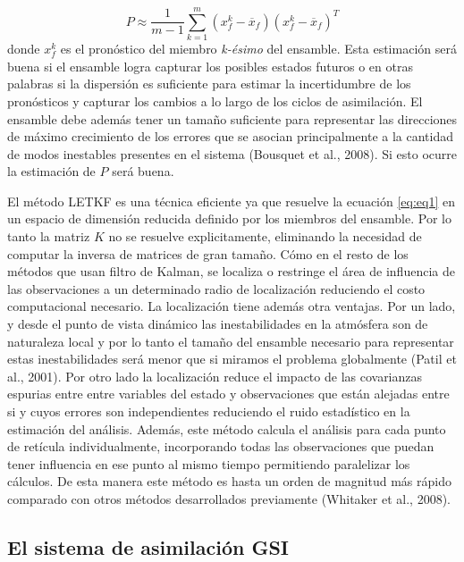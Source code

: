 \documentclass[12pt,oneside,a4paper]{reedthesis}
\begin{document}
\begin{equation}
P \approx \frac{1}{m-1} \sum_{k=1}^{m}(x_{f}^{k}-\overline{x}_f)(x_{f}^{k}-\overline{x}_f)^T
\label{eq:eq5}
\end{equation}
donde \(x_{f}^{k}\) es el pronóstico del miembro \emph{k-ésimo} del ensamble. Esta estimación será buena si el ensamble logra capturar los posibles estados futuros o en otras palabras si la dispersión es suficiente para estimar la incertidumbre de los pronósticos y capturar los cambios a lo largo de los ciclos de asimilación. El ensamble debe además tener un tamaño suficiente para representar las direcciones de máximo crecimiento de los errores que se asocian principalmente a la cantidad de modos inestables presentes en el sistema (Bousquet et al., 2008). Si esto ocurre la estimación de \(P\) será buena.

El método LETKF es una técnica eficiente ya que resuelve la ecuación \eqref{eq:eq1} en un espacio de dimensión reducida definido por los miembros del ensamble. Por lo tanto la matriz \(K\) no se resuelve explicitamente, eliminando la necesidad de computar la inversa de matrices de gran tamaño. Cómo en el resto de los métodos que usan filtro de Kalman, se localiza o restringe el área de influencia de las observaciones a un determinado radio de localización reduciendo el costo computacional necesario. La localización tiene además otra ventajas. Por un lado, y desde el punto de vista dinámico las inestabilidades en la atmósfera son de naturaleza local y por lo tanto el tamaño del ensamble necesario para representar estas inestabilidades será menor que si miramos el problema globalmente (Patil et al., 2001). Por otro lado la localización reduce el impacto de las covarianzas espurias entre entre variables del estado y observaciones que están alejadas entre si y cuyos errores son independientes reduciendo el ruido estadístico en la estimación del análisis. Además, este método calcula el análisis para cada punto de retícula individualmente, incorporando todas las observaciones que puedan tener influencia en ese punto al mismo tiempo permitiendo paralelizar los cálculos. De esta manera este método es hasta un orden de magnitud más rápido comparado con otros métodos desarrollados previamente (Whitaker et al., 2008).

\hypertarget{el-sistema-de-asimilaciuxf3n-gsi}{%
\subsection{El sistema de asimilación GSI}\label{el-sistema-de-asimilaciuxf3n-gsi}}
\end{document}
